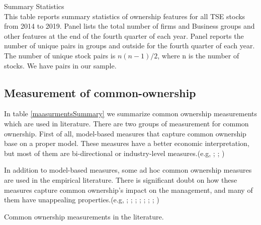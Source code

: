 	
				
		\captionsetup[subtable]{labelformat=parens}
			\renewcommand{\thesubtable}{\Alph{subtable}}
			 \begin{table}[htbp]
			 \caption{ Summary Statistics \\ 
			 This table reports summary statistics of ownership features for all TSE stocks from 2014 to 2019. Panel  lists the total number of firms and Business groups and other features at the end of the fourth quarter of each year. Panel  reports the number of unique pairs in groups and outside for the fourth quarter of each year. The number of unique stock pairs is $ n(n-1)/2 $, where n is the number of stocks. We have \myname pairs in our sample.  }
			\centering
			\label{t2-1}
			\resizebox{1\textwidth}{!}
			{
				
			}
			
		\centering
	\bigskip
		\label{t2-2}
		\resizebox{1\textwidth}{!}
		{
			
		}
	\end{table}
	
	\captionsetup[subtable]{labelformat=empty}

	
	
	


\FloatBarrier


\subsection{{Measurement of common-ownership}}


In table \ref{maasurmentsSummary} we summarize common ownership measurements which are used in literature. There are two groups of measurement for common ownership.
First of all, model-based measures that capture common ownership base on a proper  model. These measures have a better economic interpretation, but most of them are bi-directional or industry-level measures.(e.g, \cite{harford2011institutional}; \cite{azar2018anticompetitive}; \cite{gilje2020s})

In addition to model-based measures, some ad hoc common ownership measures are used in the empirical literature. There is significant doubt on how these measures capture common ownership's impact on the management, and many of them have unappealing properties.(e.g, \cite{AntonPolk}; \cite{azar2011new}; \cite{freeman2019effects}; \cite{hansen1996externalities};  \cite{he2017product}; \cite{he2019internalizing}; \cite{lewellen2021does}; \cite{newham2018common})
	{\begin{table}[htbp]
			\centering
			\scriptsize
			\caption{ Common ownership measurements in the literature.}
			\label{maasurmentsSummary}
			\resizebox{\textwidth}{!}{
				
			}
		\end{table}
	}
	
